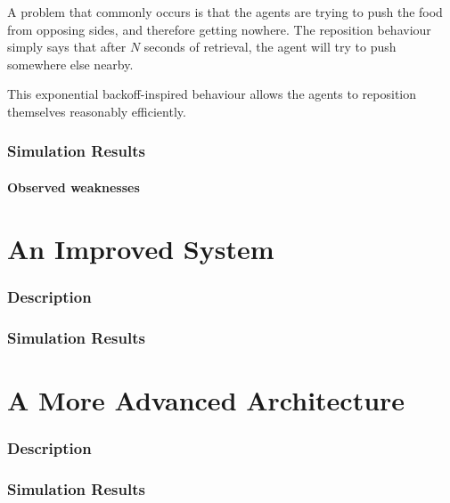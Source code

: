 \documentclass[a4paper]{article}
\begin{document}
A problem that commonly occurs is that the agents are trying to push the food from opposing sides, and therefore getting nowhere.
The reposition behaviour simply says that after $ N $ seconds of retrieval, the agent will try to push somewhere else nearby.

This exponential backoff-inspired behaviour allows the agents to reposition themselves reasonably efficiently.

\section{Simulation Results}


\subsection{Observed weaknesses}
\part{An Improved System}

\section{Description}



\section{Simulation Results}
\part{A More Advanced Architecture}

\section{Description}
\newpage
\section{Simulation Results}





\newpage
\end{document}
